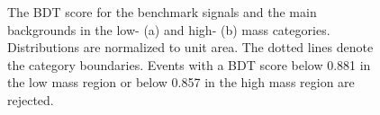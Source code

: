 \begin{figure}[htbp]
    \centering
    \caption{The BDT score for the benchmark signals and the main backgrounds in the low- (a) and high- (b) mass categories. Distributions are normalized to unit area. The dotted lines denote the category boundaries. Events with a BDT score below 0.881 in the low mass region or below 0.857 in the high mass region are rejected.}
    \label{fig:HHyybb:ObjEvt:Evt:dBDT}
\end{figure}


